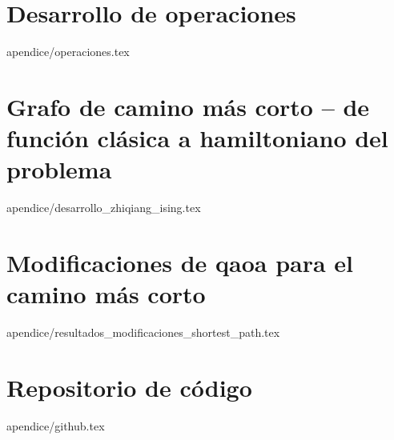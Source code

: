 \documentclass[epsbased,copyright,final,printable,covers,extendedindex,firstnumbered,tfg,lof,lot]{tfgtfmthesisuam}
\begin{document}
\chapter{Desarrollo de operaciones}{apendice/operaciones.tex}
\chapter{Grafo de camino más corto {--} de función clásica a hamiltoniano del problema\label{CAP:DESARROLLO_ZHIQIANG_ISING}}{apendice/desarrollo_zhiqiang_ising.tex}
\chapter{Modificaciones de qaoa para el camino más corto\label{CAP:OTRAS_SOLUCIONES}}{apendice/resultados_modificaciones_shortest_path.tex}
\chapter{Repositorio de código\label{CAP:github}}{apendice/github.tex}
\end{document}
